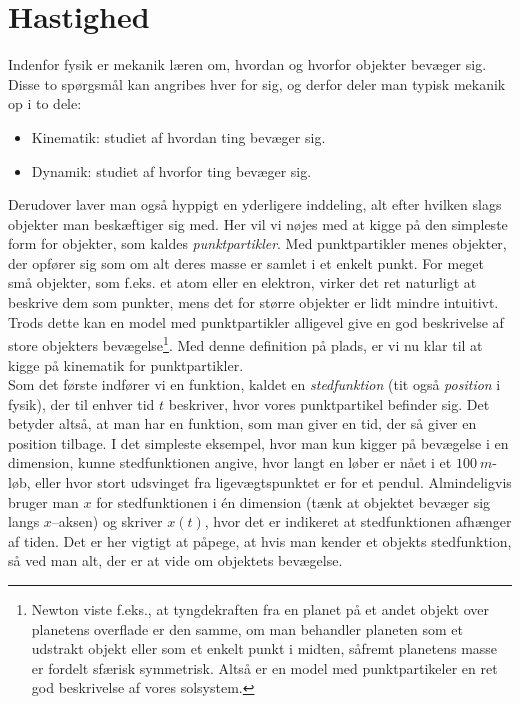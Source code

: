 \section{Hastighed}\label{mat:sec:vel}
Indenfor fysik er mekanik læren om, hvordan og hvorfor objekter bevæger sig. Disse to spørgsmål kan angribes hver for sig, og derfor deler man typisk mekanik op i to dele:
\begin{itemize}
\item Kinematik: studiet af hvordan ting bevæger sig.
\item Dynamik: studiet af hvorfor ting bevæger sig.
\end{itemize}
Derudover laver man også hyppigt en yderligere inddeling, alt efter hvilken slags objekter man beskæftiger sig med. Her vil vi nøjes med at kigge på den simpleste form for objekter, som kaldes \emph{punktpartikler}. Med punktpartikler menes objekter, der opfører sig som om alt deres masse er samlet i et enkelt punkt. For meget små objekter, som f.eks. et atom eller en elektron, virker det ret naturligt at beskrive dem som punkter, mens det for større objekter er lidt mindre intuitivt. Trods dette kan en model med punktpartikler alligevel give en god beskrivelse af store objekters bevægelse\footnote{Newton viste f.eks., at tyngdekraften fra en planet på et andet objekt over planetens overflade er den samme, om man behandler planeten som et udstrakt objekt eller som et enkelt punkt i midten, såfremt planetens masse er fordelt sfærisk symmetrisk. Altså er en model med punktpartikeler en ret god beskrivelse af vores solsystem.}. Med denne definition på plads, er vi nu klar til at kigge på kinematik for punktpartikler. \\


Som det første indfører vi en funktion, kaldet en \emph{stedfunktion} (tit også \emph{position} i fysik), der til enhver tid $t$ beskriver, hvor vores punktpartikel befinder sig. Det betyder altså, at man har en funktion, som man giver en tid, der så giver en position tilbage. I det simpleste eksempel, hvor man kun kigger på bevægelse i en dimension, kunne stedfunktionen angive, hvor langt en løber er nået i et $\SI{100}{m}$-løb, eller hvor stort udsvinget fra ligevægtspunktet er for et pendul. Almindeligvis bruger man $x$ for stedfunktionen i én dimension (tænk at objektet bevæger sig langs $x$--aksen) og skriver $x(t)$, hvor det er indikeret at stedfunktionen afhænger af tiden. Det er her vigtigt at påpege, at hvis man kender et objekts stedfunktion, så ved man alt, der er at vide om objektets bevægelse.

